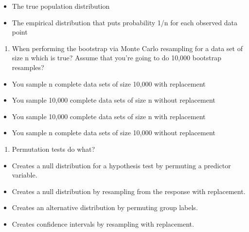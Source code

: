 \documentclass[]{article}
\begin{document}
\begin{itemize}
\itemsep1pt\parskip0pt
\item
  The true population distribution
\item
  The empirical distribution that puts probability 1/n for each observed
  data point
\end{itemize}

\begin{enumerate}
\def\labelenumi{\arabic{enumi}.}
\setcounter{enumi}{1}
\itemsep1pt\parskip0pt
\item
  When performing the bootstrap via Monte Carlo resampling for a data
  set of size n which is true? Assume that you're going to do 10,000
  bootstrap resamples?
\end{enumerate}

\begin{itemize}
\itemsep1pt\parskip0pt
\item
  You sample n complete data sets of size 10,000 with replacement
\item
  You sample 10,000 complete data sets of size n without replacement
\item
  You sample 10,000 complete data sets of size n with replacement
\item
  You sample n complete data sets of size 10,000 without replacement
\end{itemize}

\begin{enumerate}
\def\labelenumi{\arabic{enumi}.}
\setcounter{enumi}{2}
\itemsep1pt\parskip0pt
\item
  Permutation tests do what?
\end{enumerate}

\begin{itemize}
\itemsep1pt\parskip0pt
\item
  Creates a null distribution for a hypothesis test by permuting a
  predictor variable.
\item
  Creates a null distribution by resampling from the response with
  replacement.
\item
  Creates an alternative distribution by permuting group labels.
\item
  Creates confidence intervals by resampling with replacement.
\end{itemize}
\end{document}

